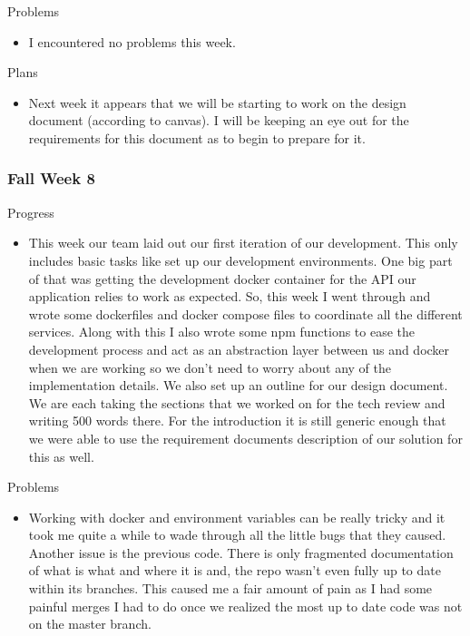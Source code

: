         \noindent
        Problems
        \begin{itemize}
            \item I encountered no problems this week.
        \end{itemize}
        
        \noindent
        Plans
        \begin{itemize}
            \item Next week it appears that we will be starting to work on the design document (according to canvas).  I will be keeping an eye out for the requirements for this document as to begin to prepare for it.
        \end{itemize}
        
    \subsubsection{Fall Week 8}
    
        \noindent
        Progress
        \begin{itemize}
            \item This week our team laid out our first iteration of our development.  This only includes basic tasks like set up our development environments.  One big part of that was getting the development docker container for the API our application relies to work as expected.  So, this week I went through and wrote some dockerfiles and docker compose files to coordinate all the different services.  Along with this I also wrote some npm functions to ease the development process and act as an abstraction layer between us and docker when we are working so we don’t need to worry about any of the implementation details.  We also set up an outline for our design document.  We are each taking the sections that we worked on for the tech review and writing 500 words there.  For the introduction it is still generic enough that we were able to use the requirement documents description of our solution for this as well.
        \end{itemize}
        
        \noindent
        Problems
        \begin{itemize}
            \item Working with docker and environment variables can be really tricky and it took me quite a while to wade through all the little bugs that they caused.  Another issue is the previous code.  There is only fragmented documentation of what is what and where it is and, the repo wasn’t even fully up to date within its branches.  This caused me a fair amount of pain as I had some painful merges I had to do once we realized the most up to date code was not on the master branch.
        \end{itemize}
        
